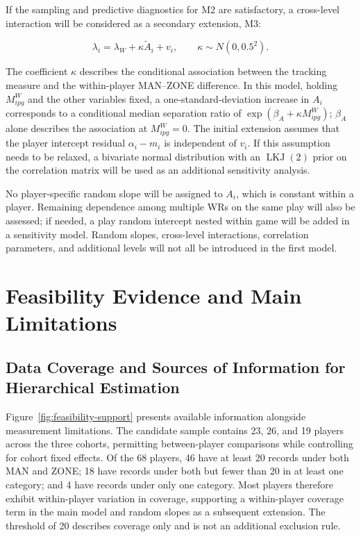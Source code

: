 \documentclass[a4paper,11pt]{article}
\begin{document}
If the sampling and predictive diagnostics for M2 are satisfactory, a cross-level interaction will be considered as a secondary extension, M3:

\begin{equation}
\lambda_i=\lambda_W+\kappa\widetilde A_i+v_i,
\qquad \kappa\sim N(0,0.5^2).
\end{equation}

The coefficient $\kappa$ describes the conditional association between the tracking measure and the within-player MAN--ZONE difference. In this model, holding $M^W_{ipg}$ and the other variables fixed, a one-standard-deviation increase in $A_i$ corresponds to a conditional median separation ratio of $\exp(\beta_A+\kappa M^W_{ipg})$; $\beta_A$ alone describes the association at $M^W_{ipg}=0$. The initial extension assumes that the player intercept residual $\alpha_i-m_i$ is independent of $v_i$. If this assumption needs to be relaxed, a bivariate normal distribution with an $\operatorname{LKJ}(2)$ prior on the correlation matrix will be used as an additional sensitivity analysis.

No player-specific random slope will be assigned to $A_i$, which is constant within a player. Remaining dependence among multiple WRs on the same play will also be assessed; if needed, a play random intercept nested within game will be added in a sensitivity model. Random slopes, cross-level interactions, correlation parameters, and additional levels will not all be introduced in the first model.

\section{Feasibility Evidence and Main Limitations}

\subsection{Data Coverage and Sources of Information for Hierarchical Estimation}

Figure~\ref{fig:feasibility-support} presents available information alongside measurement limitations. The candidate sample contains 23, 26, and 19 players across the three cohorts, permitting between-player comparisons while controlling for cohort fixed effects. Of the 68 players, 46 have at least 20 records under both MAN and ZONE; 18 have records under both but fewer than 20 in at least one category; and 4 have records under only one category. Most players therefore exhibit within-player variation in coverage, supporting a within-player coverage term in the main model and random slopes as a subsequent extension. The threshold of 20 describes coverage only and is not an additional exclusion rule.
\end{document}
